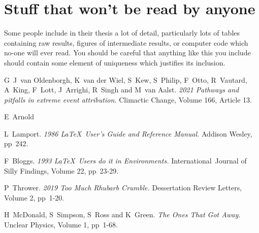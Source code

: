 \documentclass[12pt,a4paper]{report}
\begin{document}
\chapter{Stuff that won't be read by anyone}

Some people include in their thesis a lot of detail, particularly lots
of tables containing raw results, figures of intermediate results, or
computer code which no-one will ever read. You should be careful that
anything like this you include should contain some element of
uniqueness which justifies its inclusion.





\begin{thebibliography}{100}

     G~J~van Oldenborgh, K~van der Wiel, S~Kew, S~Philip, F~Otto, R~Vautard, A~King, F~Lott, J~Arrighi, R~Singh and M~van Aalst. \emph{2021 Pathways and pitfalls in extreme event attribution.} Climactic Change, Volume 166, Article 13.

     E~Arnold

     L~Lamport. \emph{1986 \LaTeX\  User's Guide and Reference Manual.} Addison Wesley, pp~242.

     F~Bloggs. \emph{1993 \LaTeX\  Users do it in Environments.} International~Journal of Silly Findings, Volume 22, pp~23-29.

     P~Thrower. \emph{2019 Too Much Rhubarb Crumble.} Dessertation Review Letters, Volume 2, pp~1-20.

     H~McDonald, S~Simpson, S~Ross and K~Green. \emph{The Ones That Got Away.} Unclear Physics, Volume 1, pp~1-68.



\end{thebibliography}
\end{document}
